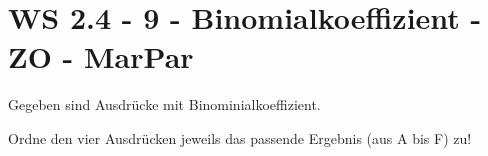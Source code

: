 \section{WS 2.4 - 9 - Binomialkoeffizient - ZO - MarPar}

\begin{beispiel}[WS 2.4]{1}
Gegeben sind Ausdrücke mit Binominialkoeffizient. 

Ordne den vier Ausdrücken jeweils das passende Ergebnis (aus A bis F) zu!

\end{beispiel}